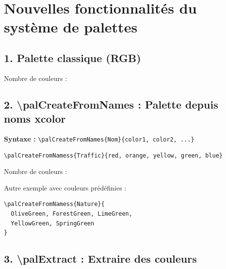 \documentclass{article}
\begin{document}
\section*{Nouvelles fonctionnalités du système de palettes}

\subsection*{1. Palette classique (RGB)}


Nombre de couleurs : 

\bigskip
{}

\subsection*{2. \textbackslash palCreateFromNames : Palette depuis noms xcolor}

\textbf{Syntaxe :} \texttt{\textbackslash palCreateFromNames\{Nom\}\{color1, color2, ...\}}

\bigskip

\begin{verbatim}
\palCreateFromNamess{Traffic}{red, orange, yellow, green, blue}
\end{verbatim}


Nombre de couleurs : 

\bigskip
{}

\bigskip

Autre exemple avec couleurs prédéfinies :
\begin{verbatim}
\palCreateFromNamess{Nature}{
  OliveGreen, ForestGreen, LimeGreen,
  YellowGreen, SpringGreen
}
\end{verbatim}


\bigskip
{}

\subsection*{3. \textbackslash palExtract : Extraire des couleurs}
\end{document}
